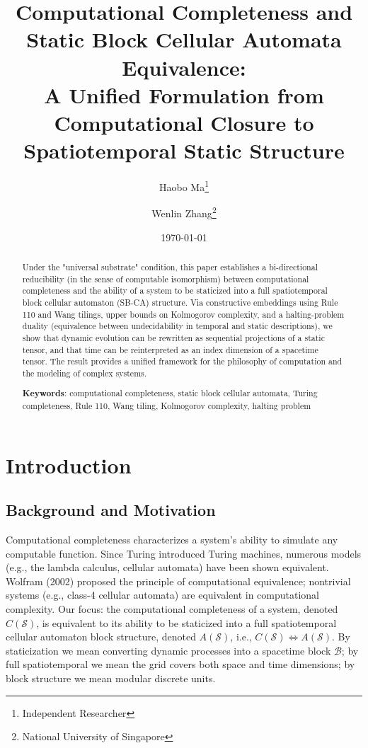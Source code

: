 \documentclass[12pt]{article}
\title{Computational Completeness and Static Block Cellular Automata Equivalence: \\
A Unified Formulation from Computational Closure to Spatiotemporal Static Structure}
\author{Haobo Ma\thanks{Independent Researcher} \and Wenlin Zhang\thanks{National University of Singapore}}
\date{\today}
\theoremstyle{plain}
\theoremstyle{definition}
\begin{document}
\maketitle

\begin{abstract}
Under the "universal substrate" condition, this paper establishes a bi-directional reducibility (in the sense of computable isomorphism) between computational completeness and the ability of a system to be staticized into a full spatiotemporal block cellular automaton (SB-CA) structure. Via constructive embeddings using Rule 110 and Wang tilings, upper bounds on Kolmogorov complexity, and a halting-problem duality (equivalence between undecidability in temporal and static descriptions), we show that dynamic evolution can be rewritten as sequential projections of a static tensor, and that time can be reinterpreted as an index dimension of a spacetime tensor. The result provides a unified framework for the philosophy of computation and the modeling of complex systems.

\textbf{Keywords}: computational completeness, static block cellular automata, Turing completeness, Rule 110, Wang tiling, Kolmogorov complexity, halting problem
\end{abstract}

\section{Introduction}

\subsection{Background and Motivation}

Computational completeness characterizes a system's ability to simulate any computable function. Since Turing introduced Turing machines, numerous models (e.g., the lambda calculus, cellular automata) have been shown equivalent. Wolfram (2002)\cite{wolfram2002} proposed the principle of computational equivalence; nontrivial systems (e.g., class-4 cellular automata) are equivalent in computational complexity. Our focus: the computational completeness of a system, denoted $C(\mathcal{S})$, is equivalent to its ability to be staticized into a full spatiotemporal cellular automaton block structure, denoted $A(\mathcal{S})$, i.e., $C(\mathcal{S}) \iff A(\mathcal{S})$. By staticization we mean converting dynamic processes into a spacetime block $\mathcal{B}$; by full spatiotemporal we mean the grid covers both space and time dimensions; by block structure we mean modular discrete units.
\end{document}
